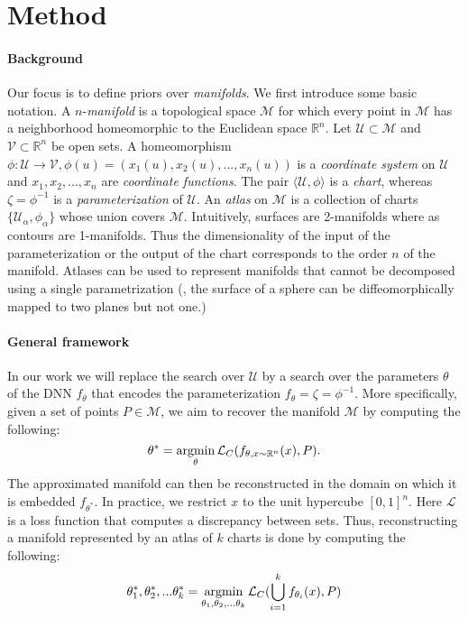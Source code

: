 \section{Method}\label{sec:method}

\paragraph*{Background} Our focus is to define priors over \emph{manifolds}.
We first introduce some basic notation.
A $n$-\emph{manifold} is a topological space $\mathcal{M}$ for which
every point in $\mathcal{M}$ has a neighborhood homeomorphic to the
Euclidean space $\mathbb{R}^n$.
Let $\mathcal{U} \subset \mathcal{M}$ and $\mathcal{V} \subset \mathbb{R}^n$ be open
sets.
A homeomorphism $\phi: \mathcal{U} \rightarrow \mathcal{V}, \phi(u) =
(x_1(u), x_2(u), ..., x_n(u))$ is a \emph{coordinate system} on
$\mathcal{U}$ and $x_1, x_2, ..., x_n$ are \emph{coordinate functions}.
The pair $\langle \mathcal{U}, \phi \rangle$ is a \emph{chart},
whereas $\zeta=\phi^{-1}$ is a \emph{parameterization} of $\mathcal{U}$.
An \emph{atlas} on $\mathcal{M}$ is a collection of charts
$\{\mathcal{U}_\alpha, \phi_\alpha\}$ whose union covers
$\mathcal{M}$. Intuitively, surfaces are 2-manifolds where as contours are 1-manifolds.
Thus the dimensionality of the input of the parameterization or the
output of the chart corresponds to the order $n$ of the manifold.
Atlases can be used to represent manifolds that cannot be decomposed
using a single parametrization (\eg, the surface of a sphere can be
diffeomorphically mapped to two planes but not one.)

\paragraph*{General framework}
In our work we will replace the search over $\mathcal{U}$ by a search over
the parameters $\theta$ of the DNN $f_\theta$ that encodes the parameterization $f_\theta=\zeta=\phi^{-1}$.
More specifically, given a set of points $P \in \mathcal{M}$, we aim to recover the manifold $\mathcal{M}$ by computing the following:
\begin{equation}
    \theta^* = \operatorname*{argmin}_\theta \mathcal{L}_C(f_{\theta, x \sim \mathbb{R}^n}(x), P).
\end{equation}
The approximated manifold can then be reconstructed in the domain on which it is embedded $f_{\theta^*}$.
In practice, we restrict $x$ to the unit hypercube $[0, 1]^n$.
Here $\mathcal{L}$ is a loss function that computes a discrepancy between sets.
Thus, reconstructing a manifold represented by an atlas of $k$ charts is done by computing the following: 
\begin{equation}
    \theta_1^*, \theta_2^*, ... \theta_k^* = \operatorname*{argmin}_{\theta_1, \theta_2, ... \theta_k} \mathcal{L}_C(\bigcup\limits_{i=1}^{k} f_{\theta_i}(x), P)
\end{equation}

